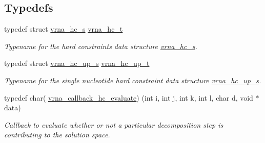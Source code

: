 \subsection*{Typedefs}
\begin{DoxyCompactItemize}
\item 
\hypertarget{group__hard__constraints_gac7e4c4f8abe3163a68110c5bff24e01d}{}typedef struct \hyperlink{group__hard__constraints_structvrna__hc__s}{vrna\+\_\+hc\+\_\+s} \hyperlink{group__hard__constraints_gac7e4c4f8abe3163a68110c5bff24e01d}{vrna\+\_\+hc\+\_\+t}\label{group__hard__constraints_gac7e4c4f8abe3163a68110c5bff24e01d}

\begin{DoxyCompactList}\small\item\em Typename for the hard constraints data structure \hyperlink{group__hard__constraints_structvrna__hc__s}{vrna\+\_\+hc\+\_\+s}. \end{DoxyCompactList}\item 
\hypertarget{group__hard__constraints_ga8cd53427a942a81c87ec526bbff32ef9}{}typedef struct \hyperlink{group__hard__constraints_structvrna__hc__up__s}{vrna\+\_\+hc\+\_\+up\+\_\+s} \hyperlink{group__hard__constraints_ga8cd53427a942a81c87ec526bbff32ef9}{vrna\+\_\+hc\+\_\+up\+\_\+t}\label{group__hard__constraints_ga8cd53427a942a81c87ec526bbff32ef9}

\begin{DoxyCompactList}\small\item\em Typename for the single nucleotide hard constraint data structure \hyperlink{group__hard__constraints_structvrna__hc__up__s}{vrna\+\_\+hc\+\_\+up\+\_\+s}. \end{DoxyCompactList}\item 
typedef char( \hyperlink{group__hard__constraints_ga16eb71ac9a7a35369be2eaa9d8f8dfa0}{vrna\+\_\+callback\+\_\+hc\+\_\+evaluate}) (int i, int j, int k, int l, char d, void $\ast$data)
\begin{DoxyCompactList}\small\item\em Callback to evaluate whether or not a particular decomposition step is contributing to the solution space. \end{DoxyCompactList}\end{DoxyCompactItemize}

